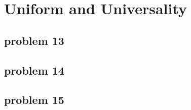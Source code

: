 \section{Uniform and Universality}

\subsection{problem 13}

\subsection{problem 14}

\subsection{problem 15}

